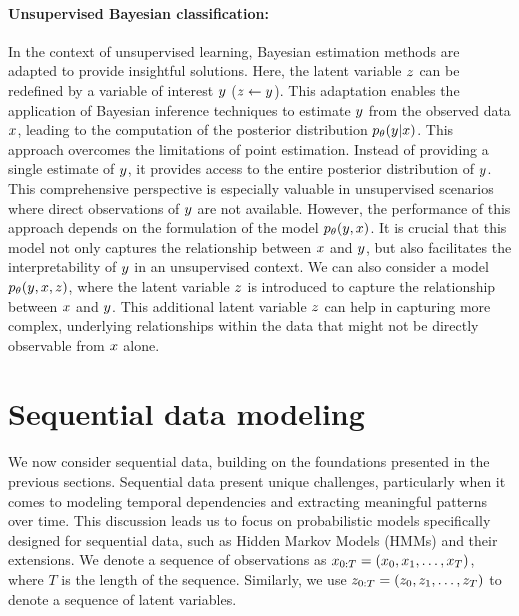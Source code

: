 \paragraph*{Unsupervised Bayesian classification:}
\label{sub:unsupervised_bayesian_estimation_classification}
In the context of unsupervised learning, Bayesian estimation methods are
adapted to provide insightful solutions. Here, the  latent variable $z$
can be redefined by a variable of interest $y$ ($z \leftarrow y$).
This adaptation enables the application of Bayesian inference techniques to
estimate $y$ from the observed data $x$,
leading to the computation of the posterior distribution $p_{\theta}(y|x)$.
This approach overcomes the limitations of point estimation. Instead of
providing a single estimate of $y$, it provides access to the entire posterior
distribution of $y$. This comprehensive perspective is especially valuable in
unsupervised scenarios where direct observations of $y$ are not available. However,
the performance of this approach depends on the formulation of the model $p_{\theta}(y, x)$. 
It is crucial that this model not only captures the relationship between $x$
and $y$, but also facilitates the interpretability of $y$ in an unsupervised context.
We can also consider a model $p_{\theta}(y, x, z)$, where the latent variable $z$
is introduced to capture the relationship between $x$ and $y$.
This additional latent variable $z$ can help in capturing more complex, underlying
relationships within the data that might not be directly observable from $x$ alone.



\section{Sequential data modeling}
\label{sec:seq_data}

We now consider sequential data, building on the foundations presented in the
previous sections. Sequential data present unique challenges, particularly
 when it comes to
modeling temporal dependencies and extracting meaningful patterns over time.
This discussion leads us to focus on probabilistic models specifically designed
for sequential data, such as Hidden Markov Models (HMMs) and their extensions.
We denote a sequence of observations as 
$x_{0:T} = (x_0, x_1, \dots, x_T)$, 
where $T$ is the length of the sequence.
Similarly, we use $z_{0:T} = (z_0, z_1, \dots, z_T)$ to
denote a sequence of latent variables.

